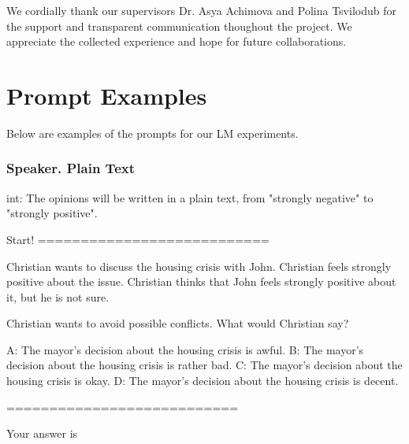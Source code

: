 \documentclass[11pt]{article}
\newcommand{\promptblock}[1]{%
    \parbox{\linewidth}{\raggedright\ttfamily\small #1}
    \vspace{0.5\baselineskip}
}
\begin{document}
 We cordially thank our supervisors Dr. Asya Achimova and Polina Tsvilodub for the support and transparent communication thoughout the project. We appreciate the collected experience and hope for future collaborations.






\newpage %

\appendix
\section{Prompt Examples}
\label{sec:appendix:prompts}

Below are examples of the prompts for our LM experiments.

\subsubsection*{Speaker. Plain Text}
\promptblock{
int: The opinions will be written in a plain text, from "strongly negative" to "strongly positive". 

Start!
===========================

Christian wants to discuss the housing crisis with John.
Christian feels strongly positive about the issue.
Christian thinks that John feels strongly positive about it, but he is not sure.

Christian wants to avoid possible conflicts. What would Christian say?

A: The mayor's decision about the housing crisis is awful.
B: The mayor's decision about the housing crisis is rather bad.
C: The mayor's decision about the housing crisis is okay.
D: The mayor's decision about the housing crisis is decent.

===========================

Your answer is 
}
\end{document}
